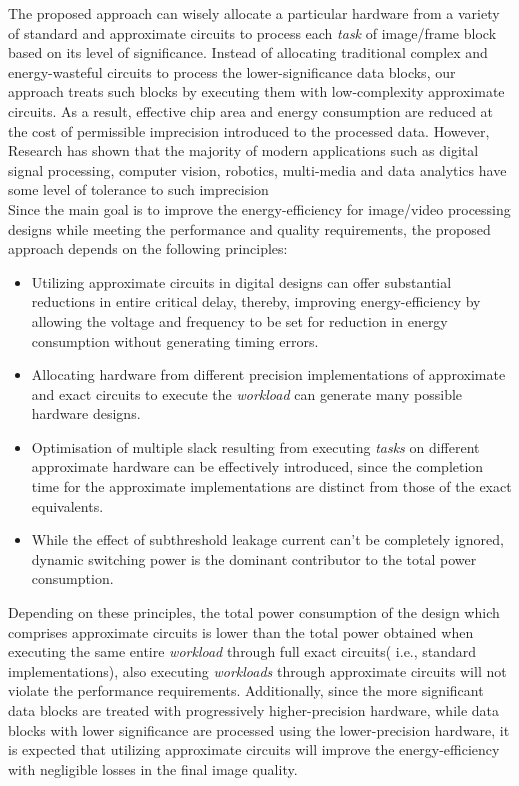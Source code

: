 \documentclass[journal]{IEEEtran}
\begin{document}
The proposed approach can wisely allocate a particular hardware from a variety of standard and approximate circuits to process each \emph{task} of image/frame block based on its level of significance. Instead of allocating traditional complex and energy-wasteful circuits to process the lower-significance data blocks, our approach treats such blocks by executing them with low-complexity approximate circuits. As a result, effective chip area and energy consumption are reduced at the cost of permissible imprecision introduced to the processed data. However, Research has shown that the majority of modern applications such as digital signal processing, computer vision, robotics, multi-media and data analytics have some level of tolerance to such imprecision  \cite{Mittal2013,Shafique2016}
  \\

Since the main goal is to improve the energy-efficiency for image/video processing designs while meeting the performance and quality requirements, the proposed approach depends on the following principles:
\begin{itemize}
\item Utilizing approximate circuits in digital designs can offer substantial reductions in entire critical delay, thereby, improving energy-efficiency by allowing the voltage and frequency to be set for reduction in energy consumption without generating timing errors. 
  \item  Allocating hardware from different precision implementations of approximate and exact circuits to execute the \emph{workload} can generate many possible hardware designs. 
  \item Optimisation of multiple slack resulting from executing \emph{tasks} on different approximate hardware can be effectively introduced, since the completion time for the approximate implementations are distinct from those of the exact equivalents.
  \item While the effect of subthreshold leakage current can't be completely ignored, dynamic switching power is the dominant contributor to the total power consumption.
 \end{itemize} 
Depending on these principles, the total power consumption of the design which comprises approximate circuits is lower than the total power obtained when executing the same entire \emph{workload} through full exact circuits( i.e., standard implementations), also executing \emph{workloads} through approximate circuits will not violate the performance requirements. Additionally, since the more significant data blocks are treated with progressively higher-precision hardware, while data blocks with lower significance are processed using the lower-precision hardware, it is expected that utilizing approximate circuits will improve the energy-efficiency with negligible losses in the final image quality.
\end{document}
